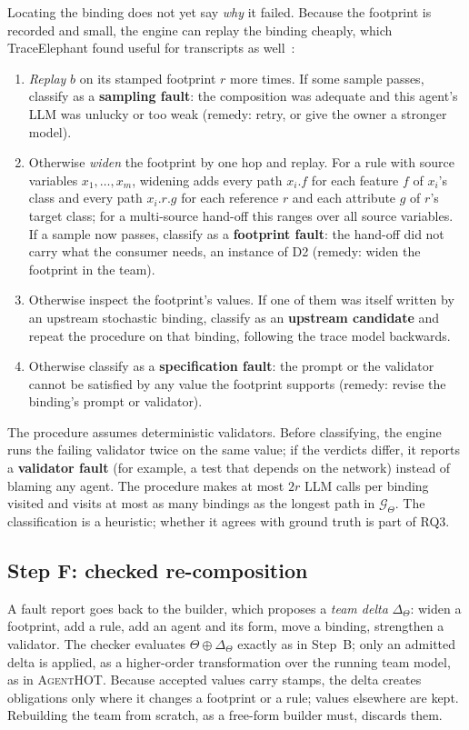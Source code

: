 \documentclass[10pt,a4paper]{article}
\newcommand{\tool}{\textsc{AgentHOT}}
\newcommand{\Team}{\Theta}
\newcommand{\D}[1]{\textsf{D#1}}
\newcommand{\what}[1]{\par\smallskip\noindent{\sffamily\bfseries\color{accent}#1}\quad}
\begin{document}
\what{Classify.} Locating the binding does not yet say \emph{why} it failed.
Because the footprint is recorded and small, the engine can replay the
binding cheaply, which TraceElephant found useful for transcripts as
well~\cite{chen2026traceelephant}:
\begin{enumerate}
\item \emph{Replay} $b$ on its stamped footprint $r$ more times. If some
sample passes, classify as a \textbf{sampling fault}: the composition was
adequate and this agent's LLM was unlucky or too weak (remedy: retry, or
give the owner a stronger model).
\item Otherwise \emph{widen} the footprint by one hop and replay. For a
rule with source variables $x_1,\dots,x_m$, widening adds every path
$x_i.f$ for each feature $f$ of $x_i$'s class and every path $x_i.r.g$ for
each reference $r$ and each attribute $g$ of $r$'s target class; for a
multi-source hand-off this ranges over all source variables. If a sample now passes, classify as a \textbf{footprint
fault}: the hand-off did not carry what the consumer needs, an instance of
\D{2} (remedy: widen the footprint in the team).
\item Otherwise inspect the footprint's values. If one of them was itself
written by an upstream stochastic binding, classify as an \textbf{upstream
candidate} and repeat the procedure on that binding, following the trace
model backwards.
\item Otherwise classify as a \textbf{specification fault}: the prompt or the
validator cannot be satisfied by any value the footprint supports (remedy:
revise the binding's prompt or validator).
\end{enumerate}
The procedure assumes deterministic validators. Before classifying, the
engine runs the failing validator twice on the same value; if the verdicts
differ, it reports a \textbf{validator fault} (for example, a test that
depends on the network) instead of blaming any agent. The procedure makes
at most $2r$ LLM calls per binding visited and visits at
most as many bindings as the longest path in $\mathcal{G}_\Team$. The
classification is a heuristic; whether it agrees with ground truth is part
of RQ3.

\subsection{Step F: checked re-composition}

A fault report goes back to the builder, which proposes a \emph{team delta}
$\Delta_\Team$: widen a footprint, add a rule, add an agent and its form,
move a binding, strengthen a validator. The checker evaluates
$\Team\oplus\Delta_\Team$ exactly as in Step~B; only an admitted delta is
applied, as a higher-order transformation over the running team model, as
in \tool{}. Because accepted values carry stamps, the delta creates
obligations only where it changes a footprint or a rule; values elsewhere
are kept. Rebuilding the team from scratch, as a free-form builder must,
discards them.
\end{document}
